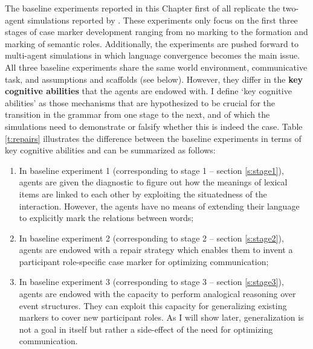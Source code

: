 The baseline experiments reported in this Chapter first of all replicate the two-agent simulations reported by \citet{steels02simulating, steels04constructivist}. These experiments only focus on the first three stages of case marker development ranging from no marking to the formation and marking of semantic roles. Additionally, the experiments are pushed forward to multi-agent simulations in which language convergence becomes the main issue. All three baseline experiments share the same world environment, communicative task, and assumptions and scaffolds (see below). However, they differ in the {\bfseries key cognitive abilities} that the agents are endowed with. I define `key cognitive abilities' as those mechanisms that are hypothesized to be crucial for the transition in the grammar from one stage to the next, and of which the simulations need to demonstrate or falsify whether this is indeed the case. Table \ref{t:repairs} illustrates the difference between the baseline experiments in terms of key cognitive abilities and can be summarized as follows:

\begin{enumerate}
\item In baseline experiment 1 (corresponding to stage 1 -- section \ref{s:stage1}), agents are given the diagnostic to figure out how the meanings of lexical items are linked to each other by exploiting the situatedness of the interaction. However, the agents have no means of extending their language to explicitly mark the relations between words;
\item In baseline experiment 2 (corresponding to stage 2 -- section \ref{s:stage2}), agents are endowed with a repair strategy which enables them to invent a participant role-specific case marker for optimizing communication;
\item In baseline experiment 3 (corresponding to stage 3 -- section \ref{s:stage3}), agents are endowed with the capacity to perform analogical reasoning over event structures. They can exploit this capacity for generalizing existing markers to cover new participant roles. As I will show later, generalization is not a goal in itself but rather a side-effect of the need for optimizing communication.
\end{enumerate}


